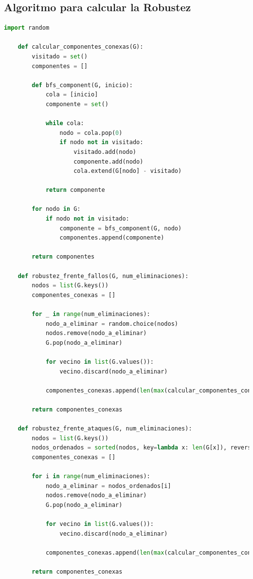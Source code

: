 \subsection{Algoritmo para calcular la Robustez}
\begin{lstlisting}[language=Python]
    import random

    def calcular_componentes_conexas(G):
        visitado = set()
        componentes = []
    
        def bfs_component(G, inicio):
            cola = [inicio]
            componente = set()
    
            while cola:
                nodo = cola.pop(0)
                if nodo not in visitado:
                    visitado.add(nodo)
                    componente.add(nodo)
                    cola.extend(G[nodo] - visitado)
    
            return componente
    
        for nodo in G:
            if nodo not in visitado:
                componente = bfs_component(G, nodo)
                componentes.append(componente)
    
        return componentes
    
    def robustez_frente_fallos(G, num_eliminaciones):
        nodos = list(G.keys())
        componentes_conexas = []
    
        for _ in range(num_eliminaciones):
            nodo_a_eliminar = random.choice(nodos)
            nodos.remove(nodo_a_eliminar)
            G.pop(nodo_a_eliminar)
            
            for vecino in list(G.values()):
                vecino.discard(nodo_a_eliminar)
    
            componentes_conexas.append(len(max(calcular_componentes_conexas(G), key=len)))
    
        return componentes_conexas
    
    def robustez_frente_ataques(G, num_eliminaciones):
        nodos = list(G.keys())
        nodos_ordenados = sorted(nodos, key=lambda x: len(G[x]), reverse=True)
        componentes_conexas = []
    
        for i in range(num_eliminaciones):
            nodo_a_eliminar = nodos_ordenados[i]
            nodos.remove(nodo_a_eliminar)
            G.pop(nodo_a_eliminar)
            
            for vecino in list(G.values()):
                vecino.discard(nodo_a_eliminar)
    
            componentes_conexas.append(len(max(calcular_componentes_conexas(G), key=len)))
    
        return componentes_conexas
\end{lstlisting}
